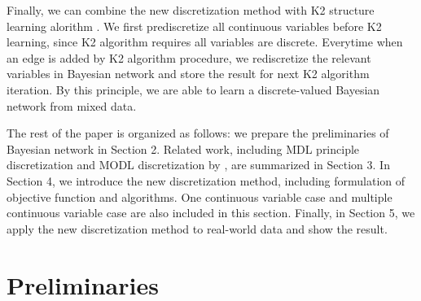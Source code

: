 Finally, we can combine the new discretization method with K2 structure learning alorithm \citep{K2}. We first prediscretize all continuous variables before K2 learning, since K2 algorithm requires all variables are discrete. Everytime when an edge is added by K2 algorithm procedure, we rediscretize the relevant variables in Bayesian network and store the result for next K2 algorithm iteration. By this principle, we are able to learn a discrete-valued Bayesian network from mixed data.

The rest of the paper is organized as follows: we prepare the preliminaries of Bayesian network in Section 2. Related work, including MDL principle discretization \citep{Friedman_1996} and MODL discretization by \citet{Boulle_2006}, are summarized in Section 3. In Section 4, we introduce the new discretization method, including formulation of objective function and algorithms. One continuous variable case and multiple continuous variable case are also included in this section. Finally, in Section 5, we apply the new discretization method to real-world data and show the result.

\section{Preliminaries}
\label{Prelim}
